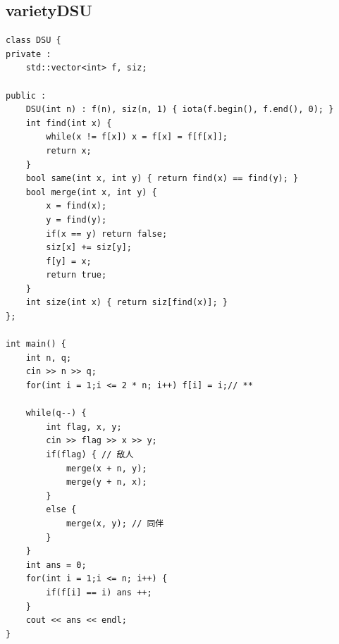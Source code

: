 \documentclass[twoside]{article}
\begin{document}
\subsection{varietyDSU}
\begin{lstlisting}
class DSU {
private :
    std::vector<int> f, siz;
    
public :
    DSU(int n) : f(n), siz(n, 1) { iota(f.begin(), f.end(), 0); }
    int find(int x) {
        while(x != f[x]) x = f[x] = f[f[x]];
        return x;
    }
    bool same(int x, int y) { return find(x) == find(y); }
    bool merge(int x, int y) {
        x = find(x);
        y = find(y);
        if(x == y) return false;
        siz[x] += siz[y];
        f[y] = x;
        return true;
    }
    int size(int x) { return siz[find(x)]; }
};

int main() {
    int n, q;
    cin >> n >> q;
    for(int i = 1;i <= 2 * n; i++) f[i] = i;// **

    while(q--) {
        int flag, x, y;
        cin >> flag >> x >> y;
        if(flag) { // 敌人
            merge(x + n, y);
            merge(y + n, x);
        }
        else {
            merge(x, y); // 同伴
        }
    }    
    int ans = 0;
    for(int i = 1;i <= n; i++) {
        if(f[i] == i) ans ++;
    }
    cout << ans << endl;
}
\end{lstlisting}
\end{document}
